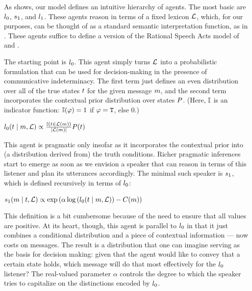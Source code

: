 \documentclass{article}
\begin{document}
As  shows, our model defines an intuitive hierarchy
of agents. The most basic are $l_{0}$, $s_{1}$, and
$l_{1}$. These agents reason in terms of a fixed lexicon
$\mathcal{L}$, which, for our purposes, can be thought of as a standard
semantic interpretation function, as in . These
agents suffice to define a version of the Rational Speech Acts model
of \citet{Frank:Goodman:2012} and \citet{Goodman:Stuhlmuller:2013}.

The starting point is $l_{0}$. This agent simply turns $\mathcal{L}$
into a probabilistic formulation that can be used for decision-making
in the presence of communicative indeterminacy. The first term just
defines an even distribution over all of the true states $t$ for
the given message $m$, and the second term incorporates the
contextual prior distribution over states $P$. (Here,
$\mathbb{I}$ is an indicator function: $\mathbb{I}(\varphi) = 1$ if
$\varphi = \texttt{T}$, else $0$.)
%
\begin{examples}
\item\label{l0}%
  $l_{0}(t \mid m, \mathcal{L}) \propto
  \frac{\mathbb{I}(t \in \mathcal{L}(m))}{|\mathcal{L}(m)|}
  P(t)$
\end{examples}

This agent is pragmatic only insofar as it incorporates the contextual
prior into (a distribution derived from) the truth conditions. Richer
pragmatic inferences start to emerge as soon as we envision a speaker
that can reason in terms of this listener and plan its utterances
accordingly. The minimal such speaker is $s_{1}$, which is
defined recursively in terms of $l_{0}$:
%
\begin{examples}
\item\label{s1}%
  $s_{1}(m \mid t, \mathcal{L}) \propto
  \exp
  \left(
    \alpha\log\left(l_{0}(t \mid m, \mathcal{L}) \right)
    - 
    C(m)
  \right)$
\end{examples}
%
This definition is a bit cumbersome because of the need to ensure that
all values are positive. At its heart, though, this agent is parallel
to $l_{0}$ in that it just combines a conditional distribution
and a piece of contextual information --- now costs on messages. The
result is a distribution that one can imagine serving as the basis
for decision making: given that the agent would like to convey that a
certain state holds, which message will do that most effectively for
the $l_{0}$ listener? The real-valued parameter $\alpha$
controls the degree to which the speaker tries to capitalize on the
distinctions encoded by $l_{0}$.
\end{document}
